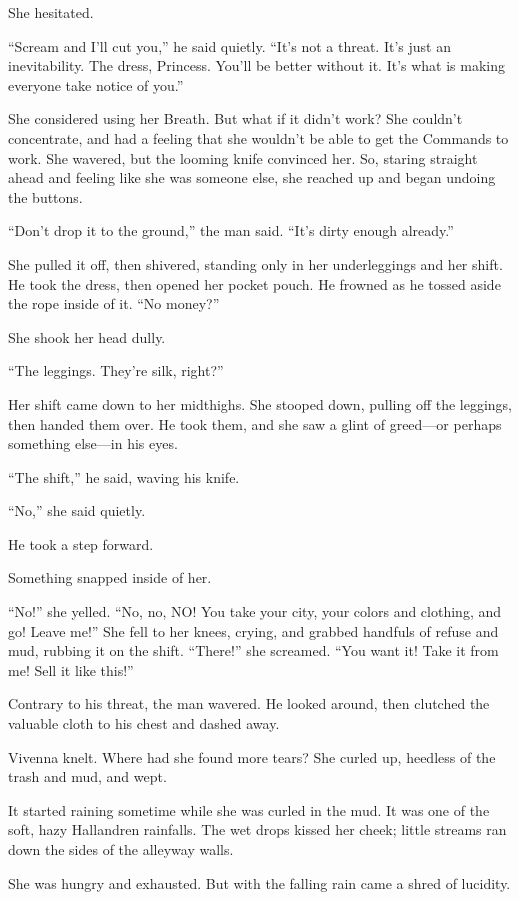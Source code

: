 She hesitated.

“Scream and I’ll cut you,” he said quietly. “It’s not a threat. It’s just an inevitability. The dress, Princess. You’ll be better without it. It’s what is making everyone take notice of you.”

She considered using her Breath. But what if it didn’t work? She couldn’t concentrate, and had a feeling that she wouldn’t be able to get the Commands to work. She wavered, but the looming knife convinced her. So, staring straight ahead and feeling like she was someone else, she reached up and began undoing the buttons.

“Don’t drop it to the ground,” the man said. “It’s dirty enough already.”

She pulled it off, then shivered, standing only in her underleggings and her shift. He took the dress, then opened her pocket pouch. He frowned as he tossed aside the rope inside of it. “No money?”

She shook her head dully.

“The leggings. They’re silk, right?”

Her shift came down to her midthighs. She stooped down, pulling off the leggings, then handed them over. He took them, and she saw a glint of greed—or perhaps something else—in his eyes.

“The shift,” he said, waving his knife.

“No,” she said quietly.

He took a step forward.

Something snapped inside of her.

“No!” she yelled. “No, no, NO! You take your city, your colors and clothing, and go! Leave me!” She fell to her knees, crying, and grabbed handfuls of refuse and mud, rubbing it on the shift. “There!” she screamed. “You want it! Take it from me! Sell it like this!”

Contrary to his threat, the man wavered. He looked around, then clutched the valuable cloth to his chest and dashed away.

Vivenna knelt. Where had she found more tears? She curled up, heedless of the trash and mud, and wept.

\orn

It started raining sometime while she was curled in the mud. It was one of the soft, hazy Hallandren rainfalls. The wet drops kissed her cheek; little streams ran down the sides of the alleyway walls.

She was hungry and exhausted. But with the falling rain came a shred of lucidity.

